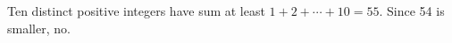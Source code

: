 Ten distinct positive integers have sum at least $1+2+\cdots+10=55$. Since 54 is smaller, $\boxed{\text{no}}$.
